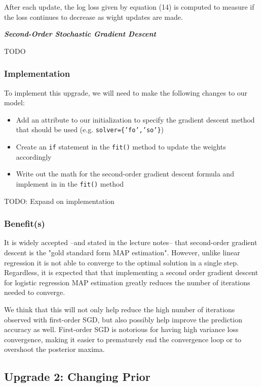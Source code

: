 \documentclass[12pt]{extarticle}
\begin{document}
After each update, the log loss given by equation (14) is computed to measure if the loss continues to decrease as wight updates are made.

\textbf{\textit{Second-Order Stochastic Gradient Descent}}

TODO


\subsubsection{Implementation}

To implement this upgrade, we will need to make the following changes to our model:

\begin{itemize}
\item Add an attribute to our initialization to specify the gradient descent method that should be used (e.g. \texttt{solver=\{'fo','so'\}})
\item Create an \texttt{if} statement in the \texttt{fit()} method to update the weights accordingly
\item Write out the math for the second-order gradient descent formula and implement in in the \texttt{fit()} method
\end{itemize}

TODO: Expand on implementation


\subsubsection{Benefit(s)}

It is widely accepted –and stated in the lecture notes– that second-order gradient descent is the "gold standard form MAP estimation". However, unlike linear regression it is not able to converge to the optimal solution in a single step. Regardless, it is expected that that implementing a second order gradient descent for logistic regression MAP estimation greatly reduces the number of iterations needed to converge.

We think that this will not only help reduce the high number of iterations observed with first-order SGD, but also possibly help improve the prediction accuracy as well. First-order SGD is notorious for having high variance loss convergence, making it easier to prematurely end the convergence loop or to overshoot the posterior maxima.


\subsection{Upgrade 2: Changing Prior}
\end{document}
